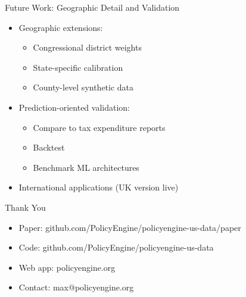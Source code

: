 \documentclass{beamer}
\begin{document}
\begin{frame}{Future Work: Geographic Detail and Validation}
    \begin{itemize}
        \item Geographic extensions:
        \begin{itemize}
            \item Congressional district weights
            \item State-specific calibration
            \item County-level synthetic data
        \end{itemize}
        \item Prediction-oriented validation:
        \begin{itemize}
            \item Compare to tax expenditure reports
            \item Backtest
            \item Benchmark ML architectures
        \end{itemize}
        \item International applications (UK version live)
    \end{itemize}
\end{frame}

\begin{frame}{Thank You}
    \begin{itemize}
        \item Paper: github.com/PolicyEngine/policyengine-us-data/paper
        \item Code: github.com/PolicyEngine/policyengine-us-data
        \item Web app: policyengine.org
        \item Contact: max@policyengine.org
    \end{itemize}
\end{frame}
\end{document}
